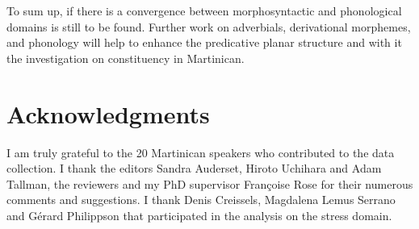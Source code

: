 \documentclass[output=paper]{langscibook}
\begin{document}
To sum up, if there is a convergence between morphosyntactic and phonological domains is still to be found. Further work on adverbials, derivational morphemes, and phonology will help to enhance the predicative planar structure and with it the investigation on constituency in Martinican. 

\section{Acknowledgments}

I am truly grateful to the 20 Martinican speakers who contributed to the data collection. I thank the editors Sandra Auderset, Hiroto Uchihara and Adam Tallman, the reviewers and my PhD supervisor Françoise Rose for their numerous comments and suggestions. I thank Denis Creissels, Magdalena Lemus Serrano and Gérard Philippson that participated in the analysis on the stress domain.


\printglossary

\sloppy\printbibliography[heading=subbibliography,notkeyword=this]
\end{document}
